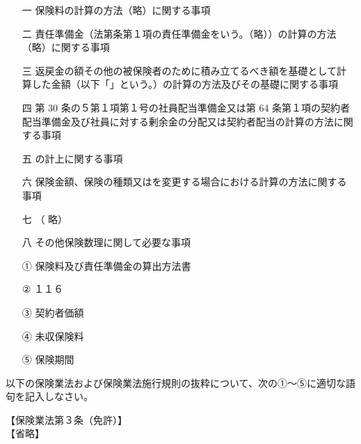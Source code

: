 \documentclass[report,gutter=10mm,fore-edge=10mm,uplatex,dvipdfmx]{jlreq}
\begin{document}
\begin{itemize}
\item[ 一  ] 保険料の計算の方法（略）に関する事項
\item[ 二  ] 責任準備金（法第条第１項の責任準備金をいう。（略））の計算の方法（略）に関する事項
\item[ 三  ] 返戻金の額その他の被保険者のために積み立てるべき額を基礎として計算した金額（以下「」という。）の計算の方法及びその基礎に関する事項
\item[ 四  ] 第 30 条の５第１項第１号の社員配当準備金又は第 64 条第１項の契約者配当準備金及び社員に対する剰余金の分配又は契約者配当の計算の方法に関する事項
\item[ 五  ] の計上に関する事項
\item[ 六  ] 保険金額、保険の種類又はを変更する場合における計算の方法に関する事項
\item[ 七  ]（ 略）
\item[ 八  ] その他保険数理に関して必要な事項
\end{itemize}

\answer{}
\begin{itemize}
\item[ ① ] 保険料及び責任準備金の算出方法書 
\item[ ② ] １１６ 
\item[ ③ ] 契約者価額 
\item[ ④ ] 未収保険料
\item[ ⑤ ] 保険期間
\end{itemize}

以下の保険業法および保険業法施行規則の抜粋について、次の①～⑤に適切な語句を記入しなさい。

【保険業法第３条（免許）】\\
【省略】
\end{document}
